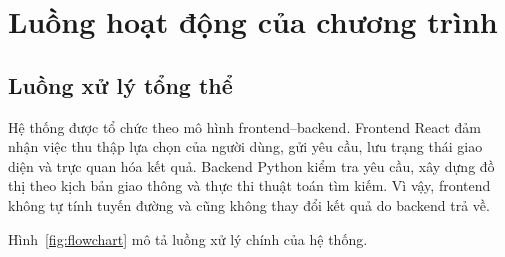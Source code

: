 
\chapter{Luồng hoạt động của chương trình}
\label{chap:program-flow}

\section{Luồng xử lý tổng thể}

Hệ thống được tổ chức theo mô hình frontend--backend. Frontend React đảm
nhận việc thu thập lựa chọn của người dùng, gửi yêu cầu, lưu trạng thái giao
diện và trực quan hóa kết quả. Backend Python kiểm tra yêu cầu, xây dựng đồ
thị theo kịch bản giao thông và thực thi thuật toán tìm kiếm. Vì vậy, frontend
không tự tính tuyến đường và cũng không thay đổi kết quả do backend trả về.

Hình~\ref{fig:flowchart} mô tả luồng xử lý chính của hệ thống.

